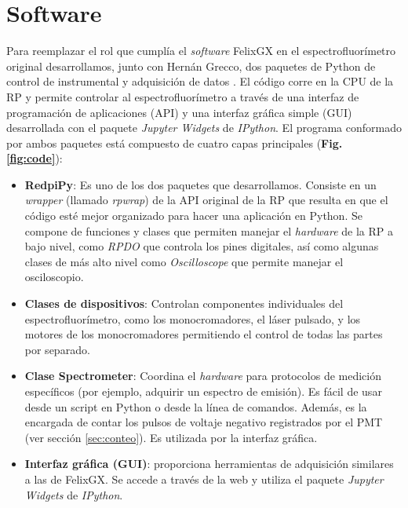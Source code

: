 

\section{Software} \label{sec:software}

Para reemplazar el rol que cumplía el \textit{software} FelixGX en el espectrofluorímetro original desarrollamos, junto con Hernán Grecco, dos paquetes de Python de control de instrumental y adquisición de datos \cite{napoli_tdinapoli_2024,grecco_hgrecco_2024}.
El código corre en la CPU de la RP y permite controlar al espectrofluorímetro a través de una interfaz de programación de aplicaciones (API) y una interfaz gráfica simple (GUI) desarrollada con el paquete \textit{Jupyter Widgets} de \textit{IPython}.
El programa conformado por ambos paquetes está compuesto de cuatro capas principales (\textbf{Fig. \ref{fig:code}}):

\begin{itemize}
     \item \textbf{RedpiPy}: Es uno de los dos paquetes que desarrollamos. Consiste en un \textit{wrapper} (llamado \textit{rpwrap}) de la API original de la RP que resulta en que el código esté mejor organizado para hacer una aplicación en Python. Se compone de funciones y clases que permiten manejar el \textit{hardware} de la RP a bajo nivel, como \textit{RPDO} que controla los pines digitales, así como algunas clases de más alto nivel como \textit{Oscilloscope} que permite manejar el osciloscopio.
     \item \textbf{Clases de dispositivos}: Controlan componentes individuales del espectrofluorímetro, como los monocromadores, el láser pulsado, y los motores de los monocromadores permitiendo el control de todas las partes por separado. 
     \item \textbf{Clase Spectrometer}: Coordina el \textit{hardware} para protocolos de medición específicos (por ejemplo, adquirir un espectro de emisión). Es fácil de usar desde un script en Python o desde la línea de comandos. Además, es la encargada de contar los pulsos de voltaje negativo registrados por el PMT (ver sección \ref{sec:conteo}). Es utilizada por la interfaz gráfica.
     \item \textbf{Interfaz gráfica (GUI)}: proporciona herramientas de adquisición similares a las de FelixGX. Se accede a través de la web y utiliza el paquete \textit{Jupyter Widgets} de \textit{IPython}.
\end{itemize}

